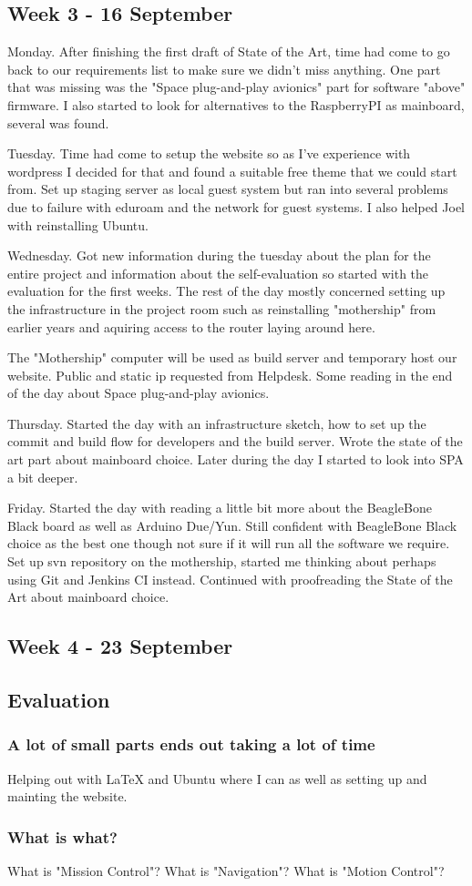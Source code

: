 \subsection{Week 3 - 16 September}\label{week_3}
Monday. After finishing the first draft of State of the Art, time
had come to go back to our requirements list to make sure we didn't miss
anything. One part that was missing was the "Space plug-and-play avionics"
part for software "above" firmware. I also started to look for alternatives
to the RaspberryPI as mainboard, several was found.

Tuesday. Time had come to setup the website so as I've experience with
wordpress I decided for that and found a suitable free theme that we could
start from. Set up staging server as local guest system but ran into several
problems due to failure with eduroam and the network for guest systems. I also
helped Joel with reinstalling Ubuntu.

Wednesday. Got new information during the tuesday about the plan for the entire
project and information about the self-evaluation so started with the
evaluation for the first weeks. The rest of the day mostly concerned setting
up the infrastructure in the project room such as reinstalling "mothership"
from earlier years and aquiring access to the router laying around here.

The "Mothership" computer will be used as build server and temporary host
our website. Public and static ip requested from Helpdesk. Some reading
in the end of the day about Space plug-and-play avionics.

Thursday. Started the day with an infrastructure sketch, how to set up the
commit and build flow for developers and the build server. Wrote the
state of the art part about mainboard choice. Later during the day I started
to look into SPA a bit deeper.

Friday. Started the day with reading a little bit more about the BeagleBone
Black board as well as Arduino Due/Yun. Still confident with BeagleBone Black
choice as the best one though not sure if it will run all the software we
require. Set up svn repository on the mothership, started me thinking about
perhaps using Git and Jenkins CI instead. Continued with proofreading
the State of the Art about mainboard choice.

\subsection{Week 4 - 23 September}\label{week_4}
\subsection{Evaluation}\label{first_period_evaluation}
\subsubsection{A lot of small parts ends out taking a lot of time}
Helping out with LaTeX and Ubuntu where I can as well as setting up and
mainting the website.

\subsubsection{What is what?}
What is "Mission Control"? What is "Navigation"? What is "Motion Control"?
